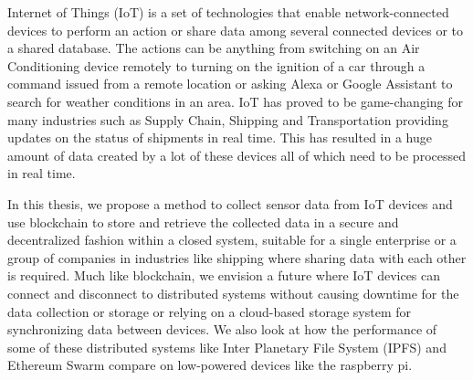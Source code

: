\documentclass[11pt,openright]{report}
\begin{document}
\thesistitlepage
\copyrightpage

\newpage


\begin{thesisabstract}

Internet of Things (IoT) is a set of technologies that enable network-connected devices to perform an action or share data among several connected devices or to a shared database. The actions can be anything from switching on an Air Conditioning device remotely to turning on the ignition of a car through a command issued from a remote location or asking Alexa or Google Assistant to search for weather conditions in an area. IoT has proved to be game-changing for many industries such as Supply Chain, Shipping and Transportation providing updates on the status of shipments in real time. This has resulted in a huge amount of data created by a lot of these devices all of which need to be processed in real time. 

In this thesis, we propose a method to collect sensor data from IoT devices and use blockchain to store and retrieve the collected data in a secure and decentralized fashion within a closed system, suitable for a single enterprise or a group of companies in industries like shipping where sharing data with each other is required. Much like blockchain, we envision a future where IoT devices can connect and disconnect to distributed systems without causing downtime for the data collection or storage or relying on a cloud-based storage system for synchronizing data between devices. We also look at how the performance of some of these distributed systems like Inter Planetary File System (IPFS) and Ethereum Swarm compare on low-powered devices like the raspberry pi.

\end{thesisabstract}


\end{document}
